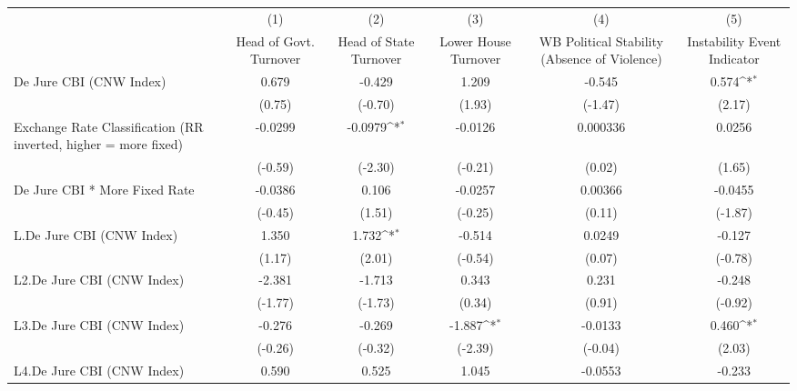 {
\def\sym#1{\ifmmode^{#1}\else\(^{#1}\)\fi}
\begin{tabular}{l*{5}{c}}
\hline\hline
                &\multicolumn{1}{c}{(1)}&\multicolumn{1}{c}{(2)}&\multicolumn{1}{c}{(3)}&\multicolumn{1}{c}{(4)}&\multicolumn{1}{c}{(5)}\\
                &\multicolumn{1}{c}{Head of Govt. Turnover}&\multicolumn{1}{c}{Head of State Turnover}&\multicolumn{1}{c}{Lower House Turnover}&\multicolumn{1}{c}{WB Political Stability (Absence of Violence)}&\multicolumn{1}{c}{Instability Event Indicator}\\
\hline
De Jure CBI (CNW Index)&    0.679         &   -0.429         &    1.209         &   -0.545         &    0.574\sym{*}  \\
                &   (0.75)         &  (-0.70)         &   (1.93)         &  (-1.47)         &   (2.17)         \\
[1em]
Exchange Rate Classification (RR inverted, higher = more fixed)&  -0.0299         &  -0.0979\sym{*}  &  -0.0126         & 0.000336         &   0.0256         \\
                &  (-0.59)         &  (-2.30)         &  (-0.21)         &   (0.02)         &   (1.65)         \\
[1em]
De Jure CBI * More Fixed Rate&  -0.0386         &    0.106         &  -0.0257         &  0.00366         &  -0.0455         \\
                &  (-0.45)         &   (1.51)         &  (-0.25)         &   (0.11)         &  (-1.87)         \\
[1em]
L.De Jure CBI (CNW Index)&    1.350         &    1.732\sym{*}  &   -0.514         &   0.0249         &   -0.127         \\
                &   (1.17)         &   (2.01)         &  (-0.54)         &   (0.07)         &  (-0.78)         \\
[1em]
L2.De Jure CBI (CNW Index)&   -2.381         &   -1.713         &    0.343         &    0.231         &   -0.248         \\
                &  (-1.77)         &  (-1.73)         &   (0.34)         &   (0.91)         &  (-0.92)         \\
[1em]
L3.De Jure CBI (CNW Index)&   -0.276         &   -0.269         &   -1.887\sym{*}  &  -0.0133         &    0.460\sym{*}  \\
                &  (-0.26)         &  (-0.32)         &  (-2.39)         &  (-0.04)         &   (2.03)         \\
[1em]
L4.De Jure CBI (CNW Index)&    0.590         &    0.525         &    1.045         &  -0.0553         &   -0.233         \\

\end{tabular}}
